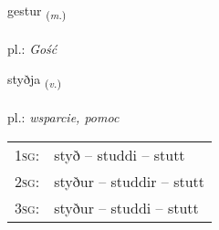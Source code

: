 \documentclass[frontgrid, backgrid]{flacards}\usepackage[]{graphicx}\usepackage[]{xcolor}
\begin{document}
\renewcommand{\blhead}{\vskip5pt {\small\bfseries\footnotesize Nafnorð | Noun }}
\renewcommand{\bcfoot}{\vskip5pt \hspace{2pt}{\small\bfseries\footnotesize 1K}}


{gestur \small{\textsubscript{(\textit{m.})}} \\[1ex] %
\textphonetic{[cɛstʏr]} \\
pl.: \emph{Gość} \\  [2ex]
\renewcommand*{\arraystretch}{0.8}
}

\renewcommand{\flhead}{\vskip5pt \fboxsep=0pt {\small\bfseries\footnotesize Sagnorð | Verb}}
\renewcommand{\fcfoot}{\vskip5pt \fboxsep=0pt \hspace{2pt}{\small\bfseries\footnotesize 1K}}

\renewcommand{\blhead}{\vskip5pt {\small\bfseries\footnotesize Sagnorð | Verb }}
\renewcommand{\bcfoot}{\vskip5pt \hspace{2pt}{\small\bfseries\footnotesize 1K}}


{styðja \small{\textsubscript{(\textit{v.})}} \\[1ex] %
\textphonetic{[stɪðja]} \\
pl.: \emph{wsparcie, pomoc} \\  [2ex]
\renewcommand*{\arraystretch}{0.8}
\begin{tabular}{p{1cm}l}
\textsc{1sg}: & styð -- studdi -- stutt \\ 
\textsc{2sg}: & styður -- studdir -- stutt \\ 
\textsc{3sg}: & styður -- studdi -- stutt \\ 
\end{tabular}
}

\renewcommand{\flhead}{\vskip5pt \fboxsep=0pt {\small\bfseries\footnotesize Nafnorð | Noun}}
\renewcommand{\fcfoot}{\vskip5pt \fboxsep=0pt \hspace{2pt}{\small\bfseries\footnotesize 1K}}
\end{document}
